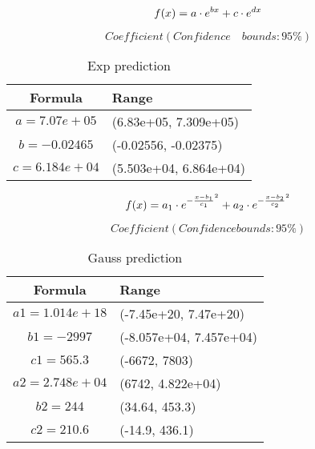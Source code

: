\documentclass[12pt]{article}  %
\begin{document}
\begin{equation}
\large f(x)=a\cdot  e^{bx}+c\cdot e^{dx}
\end{equation}

$$Coefficient(Confidence \quad bounds: 95\%)$$
\begin{table}[!htbp]
	\begin{center}
		\caption{Exp prediction}
		\begin{tabular}{cl}
			\toprule
			\multicolumn{1}{m{3cm}}{\centering Formula}
			&\multicolumn{1}{m{8cm}}{\centering Range}\\
			\midrule
			$a=7.07e+05$&   \qquad\qquad (6.83e+05, 7.309e+05)\\
			$b=-0.02465$&   \qquad\qquad (-0.02556, -0.02375)\\
			$ c=6.184e+04$ &  \qquad\qquad  (5.503e+04, 6.864e+04)\\
			\bottomrule
		\end{tabular}\label{tb:notation}
	\end{center}
\end{table}

\begin{equation}
\large f(x) =  a_1\cdot e^{-\frac{x-b_1}{c_1}^2} + a_2\cdot e^{-\frac{x-b_2}{c_2}^2}
\end{equation}

$$Coefficient(Confidence bounds: 95\%)$$

\begin{table}[!htbp]
	\begin{center}
		\caption{Gauss prediction}
		\begin{tabular}{cl}
			\toprule
			\multicolumn{1}{m{3cm}}{\centering Formula}
			&\multicolumn{1}{m{8cm}}{\centering Range}\\
			\midrule
			$a1 =  1.014e+18 $&   \qquad\qquad(-7.45e+20, 7.47e+20)\\
			$b1 =  -2997$&   \qquad\qquad (-8.057e+04, 7.457e+04)\\
			$c1 =  565.3$ &  \qquad\qquad  (-6672, 7803)\\
			$a2 =  2.748e+04$&   \qquad\qquad (6742, 4.822e+04)\\
			$b2 =  244 $&   \qquad\qquad (34.64, 453.3)\\
			$c2 =  210.6$ &  \qquad\qquad  (-14.9, 436.1)\\
			\bottomrule
		\end{tabular}\label{tb:notation}
	\end{center}
\end{table}
\end{document}
